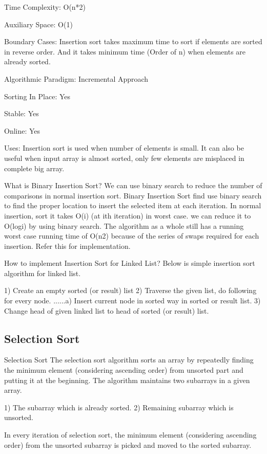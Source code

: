 \documentclass{article}
\begin{document}
Time Complexity: O(n*2)

Auxiliary Space: O(1)

Boundary Cases: Insertion sort takes maximum time to sort if elements are sorted in reverse order. And it takes minimum time (Order of n) when elements are already sorted.

Algorithmic Paradigm: Incremental Approach

Sorting In Place: Yes

Stable: Yes

Online: Yes

Uses: Insertion sort is used when number of elements is small. It can also be useful when input array is almost sorted, only few elements are misplaced in complete big array.

What is Binary Insertion Sort?
We can use binary search to reduce the number of comparisons in normal insertion sort. Binary Insertion Sort find use binary search to find the proper location to insert the selected item at each iteration. In normal insertion, sort it takes O(i) (at ith iteration) in worst case. we can reduce it to O(logi) by using binary search. The algorithm as a whole still has a running worst case running time of O(n2) because of the series of swaps required for each insertion. Refer this for implementation.

How to implement Insertion Sort for Linked List?
Below is simple insertion sort algorithm for linked list.

1) Create an empty sorted (or result) list
2) Traverse the given list, do following for every node.
......a) Insert current node in sorted way in sorted or result list.
3) Change head of given linked list to head of sorted (or result) list. 


\subsection{Selection Sort}

Selection Sort
The selection sort algorithm sorts an array by repeatedly finding the minimum element (considering ascending order) from unsorted part and putting it at the beginning. The algorithm maintains two subarrays in a given array.

1) The subarray which is already sorted.
2) Remaining subarray which is unsorted.

In every iteration of selection sort, the minimum element (considering ascending order) from the unsorted subarray is picked and moved to the sorted subarray.
\end{document}
